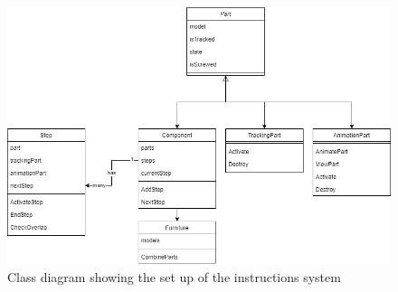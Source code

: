 \documentclass{l4proj}
\begin{document}
\begin{figure}[hbt!]
    \centering
    \includegraphics[width=0.8\linewidth]{dissertation//images/classDiagram.jpg}
    \caption{Class diagram showing the set up of the instructions system}
    \label{fig:classDiagram}
\end{figure}

\end{document}
